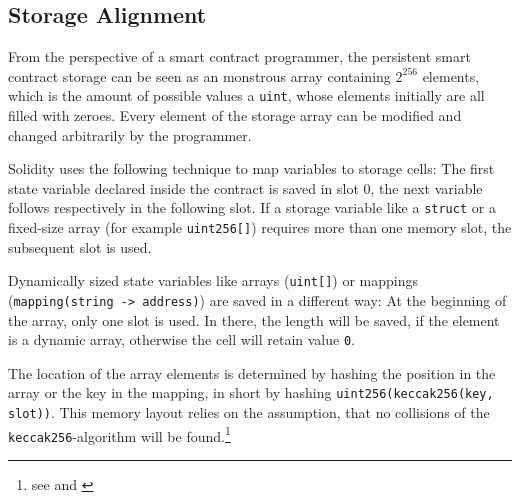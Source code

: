 \subsection{Storage Alignment}
\label{section:deepdive:memory}
From the perspective of a smart contract programmer, the persistent smart contract storage can be seen as an monstrous array containing \( 2^{256} \) elements, which is the amount of possible values a \texttt{uint}, whose elements initially are all filled with zeroes. Every element of the storage array can be modified and changed arbitrarily by the programmer.

Solidity uses the following technique to map variables to storage cells: The first state variable declared inside the contract is saved in slot \( 0 \), the next variable follows respectively in the following slot. If a storage variable like a \texttt{struct} or a fixed-size array (for example \texttt{uint256[]}) requires more than one memory slot, the subsequent slot is used.

Dynamically sized state variables like arrays (\texttt{uint[]}) or mappings (\texttt{mapping(string -> address)}) are saved in a different way: At the beginning of the array, only one slot is used. In there, the length will be saved, if the element is a dynamic array, otherwise the cell will retain value \texttt{0}.

The location of the array elements is determined by hashing the position in the array or the key in the mapping, in short by hashing \texttt{uint256(keccak256(key, slot))}. This memory layout relies on the assumption, that no collisions of the \texttt{keccak256}-algorithm will be found.\footnote{see \cite{programmingtheblockchain:storagelayout} and \cite[Layout of State Variables in Storage]{ethereum:solidity}}
